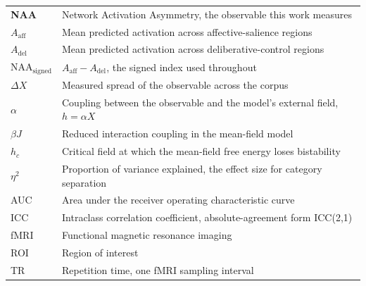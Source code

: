 \begin{tabular}{@{}l p{}@{}}
\textbf{NAA} & Network Activation Asymmetry, the observable this work measures \\
$A_{\text{aff}}$ & Mean predicted activation across affective-salience regions \\
$A_{\text{del}}$ & Mean predicted activation across deliberative-control regions \\
$\mathrm{NAA}_{\text{signed}}$ & $A_{\text{aff}} - A_{\text{del}}$, the signed index used throughout \\
$\Delta X$ & Measured spread of the observable across the corpus \\
$\alpha$ & Coupling between the observable and the model's external field, $h = \alpha X$ \\
$\beta J$ & Reduced interaction coupling in the mean-field model \\
$h_c$ & Critical field at which the mean-field free energy loses bistability \\
$\eta^2$ & Proportion of variance explained, the effect size for category separation \\
AUC & Area under the receiver operating characteristic curve \\
ICC & Intraclass correlation coefficient, absolute-agreement form ICC(2,1) \\
fMRI & Functional magnetic resonance imaging \\
ROI & Region of interest \\
TR & Repetition time, one fMRI sampling interval \\
\end{tabular}

\cleardoublepage
\pagestyle{fancy}
\setcounter{page}{1}
